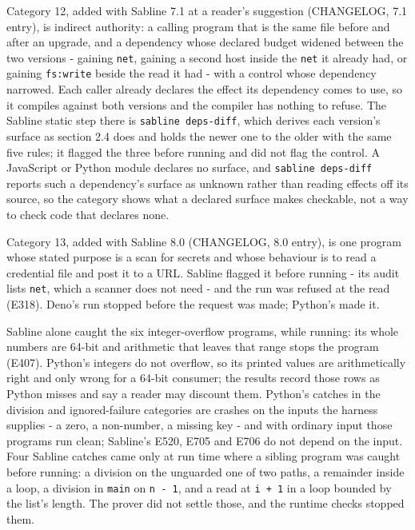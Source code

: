 \documentclass[
]{article}
\newcounter{none} %
\begin{document}
Category 12, added with Sabline 7.1 at a reader's suggestion (CHANGELOG,
7.1 entry), is indirect authority: a calling program that is the same
file before and after an upgrade, and a dependency whose declared budget
widened between the two versions - gaining \texttt{net}, gaining a
second host inside the \texttt{net} it already had, or gaining
\texttt{fs:write} beside the read it had - with a control whose
dependency narrowed. Each caller already declares the effect its
dependency comes to use, so it compiles against both versions and the
compiler has nothing to refuse. The Sabline static step there is
\texttt{sabline\ deps-diff}, which derives each version's surface as
section 2.4 does and holds the newer one to the older with the same five
rules; it flagged the three before running and did not flag the control.
A JavaScript or Python module declares no surface, and
\texttt{sabline\ deps-diff} reports such a dependency's surface as
unknown rather than reading effects off its source, so the category
shows what a declared surface makes checkable, not a way to check code
that declares none.

Category 13, added with Sabline 8.0 (CHANGELOG, 8.0 entry), is one
program whose stated purpose is a scan for secrets and whose behaviour
is to read a credential file and post it to a URL. Sabline flagged it
before running - its audit lists \texttt{net}, which a scanner does not
need - and the run was refused at the read (E318). Deno's run stopped
before the request was made; Python's made it.

Sabline alone caught the six integer-overflow programs, while running:
its whole numbers are 64-bit and arithmetic that leaves that range stops
the program (E407). Python's integers do not overflow, so its printed
values are arithmetically right and only wrong for a 64-bit consumer;
the results record those rows as Python misses and say a reader may
discount them. Python's catches in the division and ignored-failure
categories are crashes on the inputs the harness supplies - a zero, a
non-number, a missing key - and with ordinary input those programs run
clean; Sabline's E520, E705 and E706 do not depend on the input. Four
Sabline catches came only at run time where a sibling program was caught
before running: a division on the unguarded one of two paths, a
remainder inside a loop, a division in \texttt{main} on
\texttt{n\ -\ 1}, and a read at \texttt{i\ +\ 1} in a loop bounded by
the list's length. The prover did not settle those, and the runtime
checks stopped them.
\end{document}
